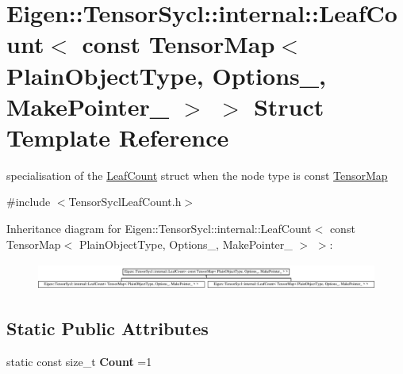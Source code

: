 \hypertarget{struct_eigen_1_1_tensor_sycl_1_1internal_1_1_leaf_count_3_01const_01_tensor_map_3_01_plain_objec08bcb0680d80100f2b3fbeaf58853ef2}{}\section{Eigen\+:\+:Tensor\+Sycl\+:\+:internal\+:\+:Leaf\+Count$<$ const Tensor\+Map$<$ Plain\+Object\+Type, Options\+\_\+, Make\+Pointer\+\_\+ $>$ $>$ Struct Template Reference}
\label{struct_eigen_1_1_tensor_sycl_1_1internal_1_1_leaf_count_3_01const_01_tensor_map_3_01_plain_objec08bcb0680d80100f2b3fbeaf58853ef2}


specialisation of the \hyperlink{struct_eigen_1_1_tensor_sycl_1_1internal_1_1_leaf_count}{Leaf\+Count} struct when the node type is const \hyperlink{class_eigen_1_1_tensor_map}{Tensor\+Map}  




{\ttfamily \#include $<$Tensor\+Sycl\+Leaf\+Count.\+h$>$}

Inheritance diagram for Eigen\+:\+:Tensor\+Sycl\+:\+:internal\+:\+:Leaf\+Count$<$ const Tensor\+Map$<$ Plain\+Object\+Type, Options\+\_\+, Make\+Pointer\+\_\+ $>$ $>$\+:\begin{figure}[H]
\begin{center}
\leavevmode
\includegraphics[height=0.903226cm]{struct_eigen_1_1_tensor_sycl_1_1internal_1_1_leaf_count_3_01const_01_tensor_map_3_01_plain_objec08bcb0680d80100f2b3fbeaf58853ef2}
\end{center}
\end{figure}
\subsection*{Static Public Attributes}
\begin{DoxyCompactItemize}
\item 
\mbox{\label{struct_eigen_1_1_tensor_sycl_1_1internal_1_1_leaf_count_3_01const_01_tensor_map_3_01_plain_objec08bcb0680d80100f2b3fbeaf58853ef2_a30b01bd1e9d171d0094d9e837410584d}} 
static const size\+\_\+t {\bfseries Count} =1
\end{DoxyCompactItemize}


